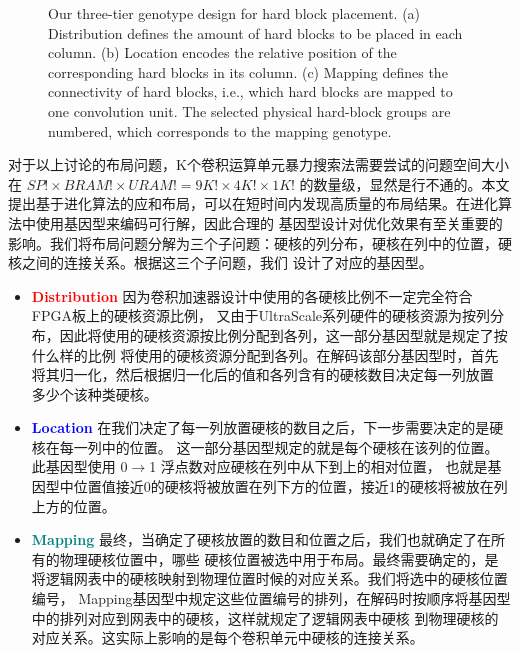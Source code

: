 \begin{figure}[t]
	\caption{Our three-tier genotype design for hard block placement. 
	(a) Distribution defines the amount of hard blocks to be placed in each column. 
	(b) Location encodes the relative position of the corresponding hard blocks in its column. 
	(c) Mapping defines the connectivity of hard blocks, i.e., which hard blocks are mapped to one convolution unit. 
	The selected physical hard-block groups are numbered, which corresponds to the mapping genotype.
	}
	
	

	\label{fig:genotype}
  \vspace{-0.2in}
\end{figure}

对于以上讨论的布局问题，K个卷积运算单元暴力搜索法需要尝试的问题空间大小在 $SP! \times BRAM! \times URAM! = 9K!\times4K!\times1K!$
的数量级，显然是行不通的。本文提出基于进化算法的应和布局，可以在短时间内发现高质量的布局结果。在进化算法中使用基因型来编码可行解，因此合理的
基因型设计对优化效果有至关重要的影响。我们将布局问题分解为三个子问题：硬核的列分布，硬核在列中的位置，硬核之间的连接关系。根据这三个子问题，我们
设计了对应的基因型。

\begin{itemize}
	\item \textcolor{red}{\bf Distribution} 因为卷积加速器设计中使用的各硬核比例不一定完全符合FPGA板上的硬核资源比例，
		又由于UltraScale系列硬件的硬核资源为按列分布，因此将使用的硬核资源按比例分配到各列，这一部分基因型就是规定了按什么样的比例
		将使用的硬核资源分配到各列。在解码该部分基因型时，首先将其归一化，然后根据归一化后的值和各列含有的硬核数目决定每一列放置
		多少个该种类硬核。
	\item \textcolor{blue}{\bf Location} 在我们决定了每一列放置硬核的数目之后，下一步需要决定的是硬核在每一列中的位置。
		这一部分基因型规定的就是每个硬核在该列的位置。此基因型使用 0$\rightarrow$1 浮点数对应硬核在列中从下到上的相对位置，
		也就是基因型中位置值接近0的硬核将被放置在列下方的位置，接近1的硬核将被放在列上方的位置。
	\item \textcolor{teal}{\bf Mapping} 最终，当确定了硬核放置的数目和位置之后，我们也就确定了在所有的物理硬核位置中，哪些
		硬核位置被选中用于布局。最终需要确定的，是将逻辑网表中的硬核映射到物理位置时候的对应关系。我们将选中的硬核位置编号，
		Mapping基因型中规定这些位置编号的排列，在解码时按顺序将基因型中的排列对应到网表中的硬核，这样就规定了逻辑网表中硬核
		到物理硬核的对应关系。这实际上影响的是每个卷积单元中硬核的连接关系。
\end{itemize}

